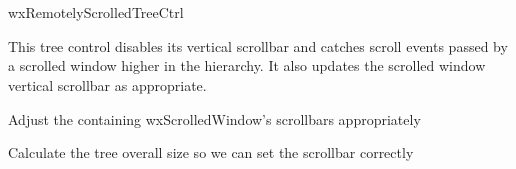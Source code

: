 %
%


\section{}\label{wxremotelyscrolledtreectrl}


wxRemotelyScrolledTreeCtrl
  
   This tree control disables its vertical scrollbar and catches scroll
   events passed by a scrolled window higher in the hierarchy.
   It also updates the scrolled window vertical scrollbar as appropriate.
 





\label{wxremotelyscrolledtreectrlwxremotelyscrolledtreectrl}



\label{wxremotelyscrolledtreectrldtor}



\label{wxremotelyscrolledtreectrladjustremotescrollbars}


Adjust the containing wxScrolledWindow's scrollbars appropriately


\label{wxremotelyscrolledtreectrlcalctreesize}




Calculate the tree overall size so we can set the scrollbar
correctly


\label{wxremotelyscrolledtreectrlgetcompanionwindow}

